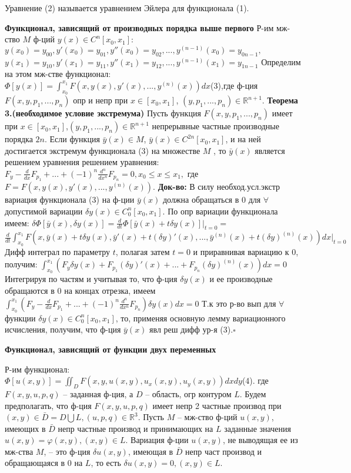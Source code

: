 Уравнение (2) называется уравнением Эйлера для функционала (1).

\textbf{Функционал, зависящий от производных порядка выше
первого}
Р-им мж-ство $M$ ф-ций $y(x) \in C^n[x_0, x_1]:$
$y(x_0) = y_{00} , y'(x_0) = y_{01}, y''(x_0) = y_{02},..., y^{(n-1)}(x_0) = y_{0n-1},$
$y(x_1) = y_{10} , y'(x_1) = y_{11}, y''(x_1) = y_{12},..., y^{(n-1)}(x_1) = y_{1n-1}$
Определим на этом мж-стве функционал:$\Phi[y(x)]=\int_{x_0}^{x_1}F(x,y(x),y'(x),...,y^{(n)}(x))dx$(3),где ф-ция $F(x,y,p_1,...,p_n)$ опр и непр при $x \in [x_0, x_1]$,
$(y,p_1,..., p_n) \in \mathbb{R}^{n+1}$.
\textbf{Теорема 3.(необходимое условие экстремума)}
    Пусть функция $F(x,y,p_1,...,p_n)$ имеет при $x\in[x_0, x_1]$,$(y,p_1,..., p_n) \in \mathbb{R}^{n+1}$ непрерывные частные производные порядка $2n$. Если функция $\bar y(x) \in M$, $\bar y(x) \in C^{2n}[x_0, x_1]$, и на ней достигается экстремум функционала (3) на множестве $M$ , то $\bar y(x)$ является решением уравнения
    решением уравнения:
    $F_y-\frac{d}{dx}F_{p_1}+...+(-1)^n\frac{d^n}{dx^n}F_{p_n}=0, x_0 \leq x \leq x_1,$
    где $F = F(x,y(x),y'(x),..., y^{(n)}(x))$.
\textbf{Док-во:}
    В силу необход.усл.экстр вариация
    функционала (3) на ф-ции $\bar y(x)$ должна обращаться в 0 для
    $\forall$ допустимой вариации $\delta y(x) \in C^n_0[x_0, x_1]$.
    По опр вариации функционала имеем:
    $\delta\Phi[\bar y(x), \delta y(x)]=\frac{d}{dt}\Phi[\bar y(x)+t\delta y(x)]\Big|_{t=0}=$
    $\frac{d}{dt}\int_{x_0}^{x_1}F(x,\bar y(x) + t\delta y(x), \bar y'(x)+t(\delta y)'(x),...,\bar y^{(n)}(x)+t(\delta y)^{(n)}(x))dx\Big|_{t=0}$
    Дифф интеграл по параметру $t$, полагая затем $t = 0$ и приравнивая вариацию к 0, получим:
    $\int_{x_0}^{x_1}(F_y\delta y(x) + F_{p_1}(\delta y)'(x)+...+F_{p_n}(\delta y)^{(n)}(x))dx=0$
    Интегрируя по частям и учитывая то, что ф-ция $\delta y(x)$ и ее производные обращаются в 0 на концах отрезка, имеем
    $\int_{x_0}^{x_1} (F_y-\frac{d}{dx}F_{p_1}+...+(-1)^n\frac{d^n}{dx^n}F_{p_n})\delta y(x) dx=0$
    Т.к это р-во вып для $\forall$ функции $\delta y(x) \in C^n_0[x_0, x_1]$,
    то, применяя основную лемму вариационного исчисления, получим, что
    ф-ция $\bar y(x)$ явл реш дифф ур-я (3).$\square$

\textbf{Функционал, зависящий от функции двух переменных}

Р-им функционал: $ \Phi[u(x, y)]=\iint_D F(x, y, u(x, y), u_x(x, y), u_y(x, y))dxdy$(4).
где $F(x, y, u, p, q)$ – заданная ф-ция, а $D$ – область, огр контуром $L$. Будем предполагать, что ф-ция $F(x, y, u, p, q)$ имеет непр 2 частные производ при $(x, y) \in \bar D = D \bigcup L, (u, p, q) \in \mathbb{R}^3$. Пусть $M$ – мж-ство ф-ций $u(x, y)$, имеющих в $\bar D$ непр частные производ и принимающих на $L$ заданные значения $u(x, y) = \varphi(x, y),(x, y) \in L$. Вариация ф-ции $u(x, y)$, не выводящая ее из мж-ства $M$, – это ф-ция $\delta u(x, y)$, имеющая в $\bar D$ непр част производ и обращающаяся в 0 на $L$, то есть $\delta u(x, y) = 0,(x, y) \in L$.

